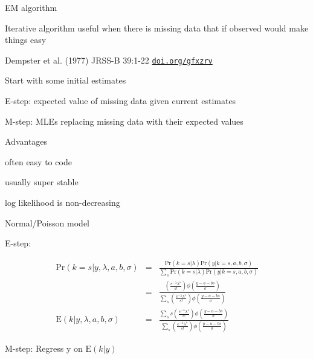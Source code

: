 \documentclass[aspectratio=169,12pt,t]{beamer}
\begin{document}
\begin{frame}{EM algorithm}

\vspace{-3mm}

  \bbi
  \item Iterative algorithm useful when there is missing data that if
    observed would make things easy
  \item Dempster et al. (1977) JRSS-B 39:1-22
    \href{https://doi.org/gfxzrv}{\tt doi.org/gfxzrv}
  \item Start with some initial estimates
  \item {\hilit E-step}: expected value of missing data given current estimates
  \item {\hilit M-step}: MLEs replacing missing data with their expected values
  \item {\hilit Advantages}
    \bi
  \item often easy to code
  \item usually super stable
  \item log likelihood is non-decreasing
    \ei
    \ei

\end{frame}



\begin{frame}{Normal/Poisson model}

  {\hilit E-step}:

\vspace{-3mm}

  \begin{eqnarray*}
      \text{Pr}(k = s | y, \lambda, a, b, \sigma) & = & \frac{\text{Pr}(k = s | \lambda)
      \text{Pr}(y | k = s, a, b, \sigma)}{\sum_s \text{Pr}(k = s | \lambda)
        \text{Pr}(y | k = s, a, b, \sigma)} \\
      & = & \frac{\left(\frac{e^{-\lambda} \lambda^s}{s!}\right) \phi\left(\frac{y-a-bs}{\sigma}\right)}{
\sum_s \left(\frac{e^{-\lambda} \lambda^s}{s!}\right)
\phi\left(\frac{y-a-bs}{\sigma}\right)} \\[18pt]
      \text{E}(k | y, \lambda, a, b, \sigma)
      & = & \frac{\sum_s s \left(\frac{e^{-\lambda}
          \lambda^s}{s!}\right)
        \phi\left(\frac{y-a-bs}{\sigma}\right)}{\sum_s
        \left(\frac{e^{-\lambda} \lambda^s}{s!}\right)
        \phi\left(\frac{y-a-bs}{\sigma}\right)}
  \end{eqnarray*}


  \vspace{5mm}

  {\hilit M-step}: Regress y on $\text{E}(k|y)$


\end{frame}
\end{document}
